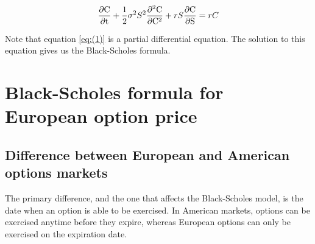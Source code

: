 \documentclass[a4paper,10pt]{article}
\begin{document}
\begin{equation}
    \huge
    \frac{\partial \mathrm C}{\partial \mathrm t}
    +
    \frac{1}{2}\sigma^{2}S^{2}
    \frac{\partial^{2} \mathrm C}{\partial \mathrm C^{2}}
    +
    rS\frac{\partial \mathrm C}{\partial \mathrm S}
    =
    rC
    \label{eq:(1)}
\end{equation}

Note that equation \ref{eq:(1)} is a partial differential equation. The solution to this equation gives us the Black-Scholes formula.

\section{Black-Scholes formula for European option price}

\subsection{Difference between European and American options markets}

\quad The primary difference, and the one that affects the Black-Scholes model, is the date when an option is able to be exercised. In American markets, options can be exercised anytime before they expire, whereas European options can only be exercised on the expiration date.
\end{document}
